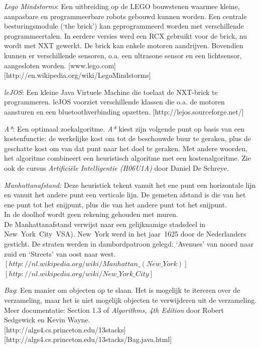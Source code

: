 \documentclass[tt3]{penoverslag}
\begin{document}



\begin{thebibliography}{9}

\textit{Lego Mindstorms}:  Een uitbreiding op de LEGO bouwstenen waarmee kleine, aanpasbare en programmeerbare robots gebouwd kunnen worden. Een centrale besturingsmodule (`the brick') kan geprogrammeerd worden met verschillende programmeertalen. In eerdere versies werd een RCX gebruikt voor de brick, nu wordt met NXT gewerkt. De brick kan enkele motoren aandrijven. Bovendien kunnen er verschillende sensoren, o.a. een ultrasone sensor en een lichtsensor, aangesloten worden.  \mbox{[www.lego.com]} \mbox{[http://en.wikipedia.org/wiki/Lego\textendash Mindstorms]}

\textit{leJOS}: Een kleine Java Virtuele Machine die toelaat de NXT-brick te programmeren. leJOS voorziet verschillende klassen die o.a. de motoren aansturen en een bluetoothverbinding opzetten.  \mbox{[http://lejos.sourceforge.net/]}

\textit{A*}: Een optimaal zoekalgoritme. \textit{A*} kiest zijn volgende punt op basis van een kostenfunctie: de werkelijke kost om tot de beschouwde buur te geraken, plus de geschatte kost om van dat punt naar het doel te geraken. Met andere woorden, het algoritme combineert een heuristisch algoritme met een kostenalgoritme. Zie ook de cursus \textit{Artifici\"ele Intelligentie (H06U1A)} door Daniel De Schreye.

\textit{Manhattanafstand:} Deze heuristiek tekent vanuit het ene punt een horizontale lijn en vanuit het andere punt een verticale lijn. De gemeten afstand is die van het ene punt tot het snijpunt, plus die van het andere punt tot het snijpunt.\\
In de doolhof wordt geen rekening gehouden met muren.\\
De Manhattanafstand verwijst naar een gelijknamige stadsdeel in New~York~City~VSA). New~York werd in het jaar~1625 door de Nederlanders gesticht. De straten werden in dambordpatroon gelegd: `Avenues' van noord naar zuid en `Streets' van oost naar west.\\
\mbox{$[http://nl.wikipedia.org/wiki/Manhattan\_(New\_York)]$}\\ \mbox{$[http://nl.wikipedia.org/wiki/New\_York\_City]$}

\textit{Bag}: Een manier om objecten op te slaan. Het is mogelijk te itereren over de verzameling, maar het is niet mogelijk objecten te verwijderen uit de verzameling. Meer documentatie: Section 1.3 of \textit{Algorithms, 4th Edition} door Robert Sedgewick en Kevin Wayne.\\
\mbox{[http://algs4.cs.princeton.edu/13stacks]} \mbox{[http://algs4.cs.princeton.edu/13stacks/Bag.java.html]}
\end{thebibliography}
\end{document}
